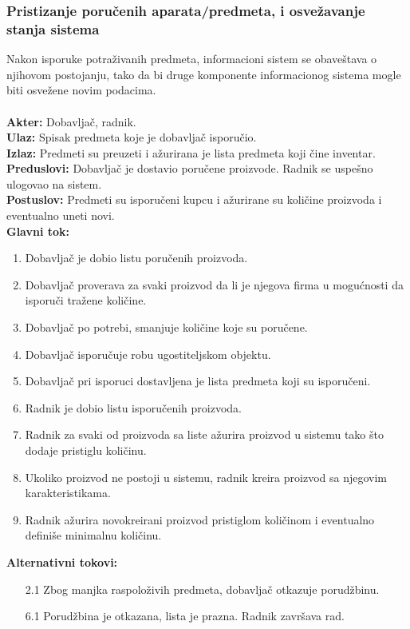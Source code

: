 \documentclass{article}
\begin{document}
\subsubsection{Pristizanje poručenih aparata/predmeta, i osvežavanje stanja sistema}
Nakon isporuke potraživanih predmeta, informacioni sistem se obaveštava o njihovom postojanju, tako da bi druge komponente informacionog sistema mogle biti osvežene novim podacima.\\\\
\textbf{Akter:} Dobavljač, radnik.\\
\textbf{Ulaz:} Spisak predmeta koje je dobavljač isporučio.\\
\textbf{Izlaz:} Predmeti su preuzeti i ažurirana je lista predmeta koji čine inventar.\\
\textbf{Preduslovi:} Dobavljač je dostavio poručene proizvode. Radnik se uspešno ulogovao na sistem.\\
\textbf{Postuslov:} Predmeti su isporučeni kupcu i ažurirane su količine proizvoda i eventualno uneti novi.\\
\textbf{Glavni tok:} 
\begin{enumerate}
	\item Dobavljač je dobio listu poručenih proizvoda.
	\item Dobavljač proverava za svaki proizvod da li je njegova firma u mogućnosti da isporuči tražene količine.
	\item Dobavljač po potrebi, smanjuje količine koje su poručene.
	\item Dobavljač isporučuje robu ugostiteljskom objektu.
	\item Dobavljač pri isporuci dostavljena je lista predmeta koji su isporučeni.  
    \item Radnik je dobio listu isporučenih proizvoda.
	\item Radnik za svaki od proizvoda sa liste ažurira proizvod u sistemu tako što dodaje pristiglu količinu.
	\item Ukoliko proizvod ne postoji u sistemu, radnik kreira proizvod sa njegovim karakteristikama.
	\item Radnik ažurira novokreirani proizvod pristiglom količinom i eventualno definiše minimalnu količinu. 
\end{enumerate}
\textbf{Alternativni tokovi:} 
\begin{itemize}
\item [2.1] Zbog manjka raspoloživih predmeta, dobavljač otkazuje porudžbinu.
\item [6.1] Porudžbina je otkazana, lista je prazna. Radnik završava rad.
\end{itemize}
\end{document}
